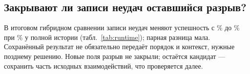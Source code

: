 \subsection{Закрывают ли записи неудач оставшийся разрыв?}

В итоговом гибридном сравнении записи неудач меняют успешность с
\HybridNoFailureRate\% до \HybridRate\% при \HybridControlRate\% у полной
истории (табл.~\ref{tab:runtime}); парная разница мала. Сохранённый
результат не обязательно передаёт порядок и контекст, нужные позднему
решению. Новые поля разрыв не закрыли; остаётся кандидат --- сохранить
часть исходных взаимодействий, что проверяется далее.

\begin{table}[htbp]
\centering\small
\caption{Итоговое гибридное сравнение с записями неудач и без них. Те же
две панели, что и в табл.~\ref{tab:composition}. Гибридные сводки не
позволяют восстановить парные отношения стоимости, пиковый промпт
и cache hit (--).}
\label{tab:runtime}
\resizebox{\linewidth}{!}{}

\medskip
\resizebox{\linewidth}{!}{}
\end{table}
